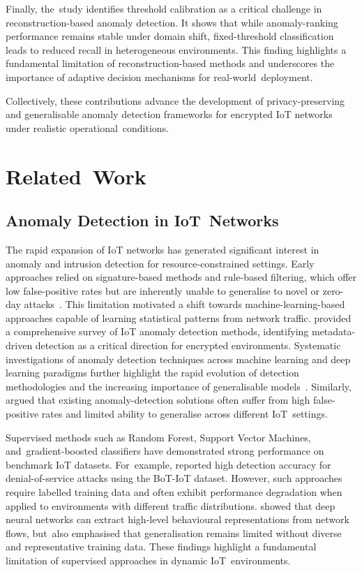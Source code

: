 \documentclass[futureinternet,article,accept,moreauthors]{Definitions/mdpi}
\begin{document}
Finally, the~study identifies threshold calibration as a critical challenge in reconstruction-based anomaly detection. It shows that while anomaly-ranking performance remains stable under domain shift, fixed-threshold classification leads to reduced recall in heterogeneous environments. This finding highlights a fundamental limitation of reconstruction-based methods and underscores the importance of adaptive decision mechanisms for real-world~deployment.

Collectively, these contributions advance the development of privacy-preserving and generalisable anomaly detection frameworks for encrypted IoT networks under realistic operational~conditions.

\section{Related~Work} \label{sec3}
\subsection{Anomaly Detection in IoT~Networks}

The rapid expansion of IoT networks has generated significant interest in anomaly and intrusion detection for resource-constrained settings. Early approaches relied on signature-based methods and rule-based filtering, which offer low false-positive rates but are inherently unable to generalise to novel or zero-day attacks~\cite{chandola2009}. This limitation motivated a shift towards machine-learning-based approaches capable of learning statistical patterns from network traffic. \citet{chatterjee2022} provided a comprehensive survey of IoT anomaly detection methods, identifying metadata-driven detection as a critical direction for encrypted environments. Systematic investigations of anomaly detection techniques across machine learning and deep learning paradigms further highlight the rapid evolution of detection methodologies and the increasing importance of generalisable \mbox{models~\cite{kumari2024}}. Similarly, \citet{araya2023} argued that existing anomaly-detection solutions often suffer from high false-positive rates and limited ability to generalise across different IoT~settings.

Supervised methods such as Random Forest, Support Vector Machines, and~gradient-boosted classifiers have demonstrated strong performance on benchmark IoT datasets. For~example, \citet{altulaihan2024} reported high detection accuracy for denial-of-service attacks using the BoT-IoT dataset. However, such approaches require labelled training data and often exhibit performance degradation when applied to environments with different traffic distributions. \citet{ahmad2021} showed that deep neural networks can extract high-level behavioural representations from network flows, but~also emphasised that generalisation remains limited without diverse and representative training data. These findings highlight a fundamental limitation of supervised approaches in dynamic IoT~environments.
\end{document}
